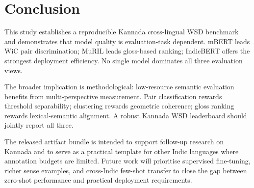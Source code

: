 \documentclass{ieeeaccess}
\begin{document}
\section{Conclusion}
\label{sec:conc}

This study establishes a reproducible Kannada cross-lingual WSD benchmark
and demonstrates that model quality is evaluation-task dependent.
mBERT leads WiC pair discrimination; MuRIL leads gloss-based ranking;
IndicBERT offers the strongest deployment efficiency.
No single model dominates all three evaluation views.

The broader implication is methodological: low-resource semantic evaluation
benefits from multi-perspective measurement.
Pair classification rewards threshold separability; clustering rewards
geometric coherence; gloss ranking rewards lexical-semantic alignment.
A robust Kannada WSD leaderboard should jointly report all three.

The released artifact bundle is intended to support follow-up research on
Kannada and to serve as a practical template for other Indic languages where
annotation budgets are limited.
Future work will prioritise supervised fine-tuning, richer sense examples,
and cross-Indic few-shot transfer to close the gap between zero-shot
performance and practical deployment requirements.
\end{document}
